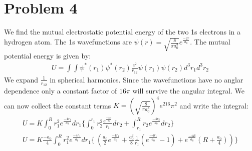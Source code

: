 \documentclass[a4paper,12pt]{article}
\numberwithin{equation}{section}
\begin{document}
\section{Problem 4}
We find the mutual electrostatic potential energy of the two 1s electrons in a hydrogen atom.
The 1s wavefunctions are $\psi(r)=\sqrt{\frac{8}{\pi a_0^3}}e^{\frac{-2r}{a_0}}$.
The mutual potential energy is given by:
\begin{gather}
 U=\int\int\psi^*(r_1)\psi^*(r_2)\frac{e^2}{r_{12}}\psi(r_1)\psi(r_2) d^3r_1 d^3r_2
\end{gather}
We expand $\frac{1}{r_{12}}$ in spherical harmonics. 
Since the wavefunctions have no anglar dependence only a constant factor of $16\pi$ will survive the angular integral.
We can now collect the constant terms $K=(\sqrt{\frac{8}{\pi a_0^3}})^4e^216\pi^2$ and write the integral:
\begin{gather}
 U=K \int_{0}^{R} r_1^2 e^{\frac{-4r_1}{a_0}}dr_1\{\int_{0}^{r_1} r_2^2\frac{ e^{\frac{-4r_2}{a_0}} }{r_1} dr_2
 + \int_{r_1}^{R} r_2 e^{\frac{-4r_2}{a_0}}  dr_2\}\\
 U=K \frac{-a_0}{4} \int_{0}^{R} r_1^2 e^{\frac{-4r_1}{a_0}}dr_1\{\ (\frac{a_0}{2}e^{\frac{-4r_1}{a_0}}+\frac{a_0^2}{8}\frac{1}{r_1}(e^{\frac{-4r_1}{a_0}} -1 ) 
 +e^{\frac{-4R}{a_0}}(R+\frac{a_0}{4}) )  \}
\end{gather}
\end{document}
